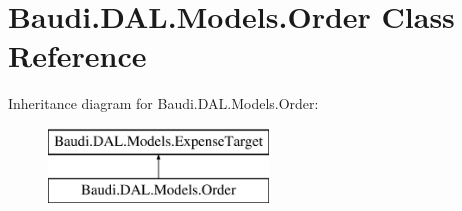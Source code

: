 \hypertarget{class_baudi_1_1_d_a_l_1_1_models_1_1_order}{}\section{Baudi.\+D\+A\+L.\+Models.\+Order Class Reference}
\label{class_baudi_1_1_d_a_l_1_1_models_1_1_order}
Inheritance diagram for Baudi.\+D\+A\+L.\+Models.\+Order\+:\begin{figure}[H]
\begin{center}
\leavevmode
\includegraphics[height=2.000000cm]{class_baudi_1_1_d_a_l_1_1_models_1_1_order}
\end{center}
\end{figure}
